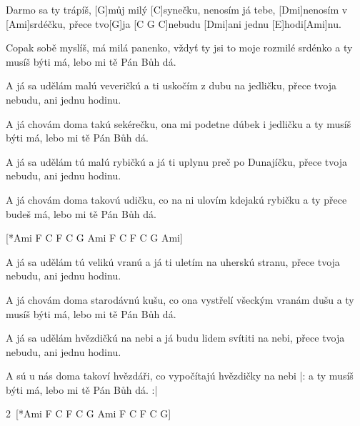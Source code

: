 
\sloka
[Ami]Darmo sa ty trápíš, [G]můj milý [C]synečku,
nenosím já tebe, [Dmi]nenosím v [Ami]srdéčku,
přece tvo[G]ja [C G C]nebudu [Dmi]ani jednu [E]hodi[Ami]nu.

\sloka
Copak sobě myslíš, má milá panenko,
vždyť ty jsi to moje rozmilé srdénko
a ty musíš býti má, lebo mi tě Pán Bůh dá.

\sloka
A já sa udělám malú veveričkú
a ti uskočím z dubu na jedličku,
přece tvoja nebudu, ani jednu hodinu.

\sloka
A já chovám doma takú sekérečku,
ona mi podetne dúbek i jedličku
a ty musíš býti má, lebo mi tě Pán Bůh dá.

\sloka
A já sa udělám tú malú rybičkú
a já ti uplynu preč po Dunajíčku,
přece tvoja nebudu, ani jednu hodinu.

\sloka
A já chovám doma takovú udičku,
co na ni ulovím kdejakú rybičku
a ty přece budeš má, lebo mi tě Pán Bůh dá.

[*Ami F C F C G Ami F C F C G Ami]

\sloka
A já sa udělám tú velikú vranú
a já ti uletím na uherskú stranu,
přece tvoja nebudu, ani jednu hodinu.

\sloka
A já chovám doma starodávnú kušu,
co ona vystřelí všeckým vranám dušu
a ty musíš býti má, lebo mi tě Pán Bůh dá.

\sloka
A já sa udělám hvězdičkú na nebi
a já budu lidem svítiti na nebi,
přece tvoja nebudu, ani jednu hodinu.

\sloka
A sú u nás doma takoví hvězdáři,
co vypočítajú hvězdičky na nebi
|: a ty musíš býti má, lebo mi tě Pán Bůh dá. :|

2\x\ [*Ami F C F C G Ami F C F C G]
